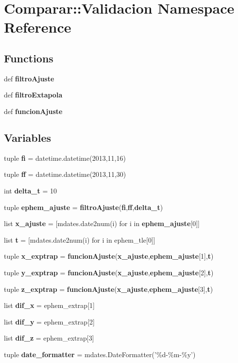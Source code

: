 \section{\-Comparar\-:\-:\-Validacion \-Namespace \-Reference}
\label{namespace_comparar_1_1_validacion}
\subsection*{\-Functions}
\begin{DoxyCompactItemize}
\item 
def {\bf filtro\-Ajuste}
\item 
def {\bf filtro\-Extapola}
\item 
def {\bf funcion\-Ajuste}
\end{DoxyCompactItemize}
\subsection*{\-Variables}
\begin{DoxyCompactItemize}
\item 
tuple {\bf fi} = datetime.\-datetime(2013,11,16)
\item 
tuple {\bf ff} = datetime.\-datetime(2013,11,30)
\item 
int {\bf delta\-\_\-t} = 10
\item 
tuple {\bf ephem\-\_\-ajuste} = {\bf filtro\-Ajuste}({\bf fi},{\bf ff},{\bf delta\-\_\-t})
\item 
list {\bf x\-\_\-ajuste} = [mdates.\-date2num(i) for i in {\bf ephem\-\_\-ajuste}[0]]
\item 
list {\bf t} = [mdates.\-date2num(i) for i in ephem\-\_\-tle[0]]
\item 
tuple {\bf x\-\_\-exptrap} = {\bf funcion\-Ajuste}({\bf x\-\_\-ajuste},{\bf ephem\-\_\-ajuste}[1],{\bf t})
\item 
tuple {\bf y\-\_\-exptrap} = {\bf funcion\-Ajuste}({\bf x\-\_\-ajuste},{\bf ephem\-\_\-ajuste}[2],{\bf t})
\item 
tuple {\bf z\-\_\-exptrap} = {\bf funcion\-Ajuste}({\bf x\-\_\-ajuste},{\bf ephem\-\_\-ajuste}[3],{\bf t})
\item 
list {\bf dif\-\_\-x} = ephem\-\_\-extrap[1]
\item 
list {\bf dif\-\_\-y} = ephem\-\_\-extrap[2]
\item 
list {\bf dif\-\_\-z} = ephem\-\_\-extrap[3]
\item 
tuple {\bf date\-\_\-formatter} = mdates.\-Date\-Formatter('\%d-\/\%m-\/\%y')
\end{DoxyCompactItemize}


